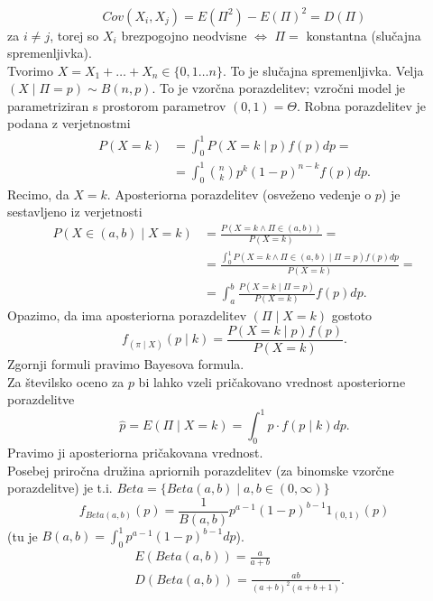 \documentclass[a4paper, 12pt]{book}
\theoremstyle{definition}
\theoremstyle{remark}
\begin{document}
\begin{equation*}
  Cov(X_i, X_j) = E(\Pi^2) - E(\Pi)^2 = D(\Pi)
\end{equation*}
za $i \neq j$, torej so $X_i$ brezpogojno neodvisne $\iff$ $\Pi =$ konstantna (slučajna spremenljivka). \\
Tvorimo $X = X_1 + \dots + X_n \in \{0, 1 \dots n\}$.
To je  slučajna spremenljivka.
Velja $(X\mid \Pi = p) \sim B(n,p)$.
To je vzorčna porazdelitev; vzročni model je parametriziran s prostorom parametrov $(0,1) = \Theta$.
Robna porazdelitev je podana z verjetnostmi
\begin{align*}
  P(X = k) &= \int_{0}^{1} P(X = k \mid p) f(p) dp = \\
  &= \int_{0}^{1} \binom{n}{k} p^k (1-p)^{n-k} f(p) dp.
\end{align*}
Recimo, da  $X = k$. Aposteriorna porazdelitev (osveženo vedenje o $p$) je sestavljeno iz verjetnosti
\begin{align*}
  P(X \in (a,b) \mid X = k) &= \frac{P(X = k \land \Pi \in (a,b))}{P(X = k)} = \\
  &= \frac{\int_{0}^{1} P(X = k \land \Pi \in (a,b) \mid \Pi = p) f(p) dp}{P(X = k)} = \\
  &= \int_{a}^{b} \frac{P(X = k \mid \Pi = p)}{P(X = k)} f(p) dp.
\end{align*}
Opazimo, da ima aposteriorna porazdelitev $(\Pi \mid X = k)$ gostoto
\begin{equation*}
  f_{(\pi \mid X)}(p \mid k) = \frac{P(X = k \mid p) f(p)}{P(X = k)}.
\end{equation*}
Zgornji formuli pravimo Bayesova formula. \\
Za številsko oceno za $p$ bi lahko vzeli pričakovano vrednost aposteriorne porazdelitve
\begin{equation*}
  \hat{p} = E(\Pi \mid X = k) = \int_{0}^{1} p \cdot f(p \mid k) dp.
\end{equation*}
Pravimo ji aposteriorna pričakovana vrednost. \\
Posebej priročna družina apriornih porazdelitev (za binomske vzorčne porazdelitve) je t.i.
$Beta = \{Beta(a,b) \mid a,b \in (0, \infty)\}$
\begin{equation*}
  f_{Beta(a,b)}(p) = \frac{1}{B(a,b)} p^{a-1} (1-p)^{b-1} 1_{(0,1)}(p)
\end{equation*}
(tu je $B(a,b) = \int_{0}^{1} p^{a-1} (1-p)^{b-1} dp$). \\
\begin{align*}
  &E(Beta(a,b)) = \frac{a}{a+b} \\
  &D(Beta(a,b)) = \frac{ab}{(a+b)^2 (a+b+1)}.
\end{align*}
\end{document}
